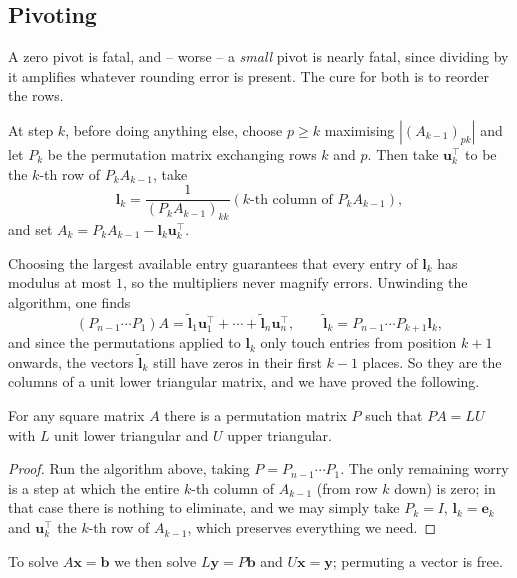 \documentclass[a4paper]{scrartcl}
\providecommand{\abs}[1]{\left\lvert#1\right\rvert}
\renewcommand{\abs}[1]{\left\lvert#1\right\rvert}
\begin{document}
\subsection{Pivoting}

A zero pivot is fatal, and -- worse -- a \emph{small} pivot is nearly fatal, since dividing by it amplifies whatever rounding error is present. The cure for both is to reorder the rows.

\begin{method}
  At step $k$, before doing anything else, choose $p \geq k$ maximising $\abs{(A_{k-1})_{pk}}$ and let $P_k$ be the permutation matrix exchanging rows $k$ and $p$. Then take $\mathbf{u}_k^\top$ to be the $k$-th row of $P_kA_{k-1}$, take
  $$
  \mathbf{l}_k = \frac{1}{(P_kA_{k-1})_{kk}}\left(k\text{-th column of }P_kA_{k-1}\right),
  $$
  and set $A_k = P_kA_{k-1} - \mathbf{l}_k\mathbf{u}_k^\top$.
\end{method}

Choosing the largest available entry guarantees that every entry of $\mathbf{l}_k$ has modulus at most $1$, so the multipliers never magnify errors. Unwinding the algorithm, one finds
$$
(P_{n-1}\cdots P_1)A = \tilde{\mathbf{l}}_1\mathbf{u}_1^\top + \cdots + \tilde{\mathbf{l}}_n\mathbf{u}_n^\top, \qquad \tilde{\mathbf{l}}_k = P_{n-1}\cdots P_{k+1}\mathbf{l}_k,
$$
and since the permutations applied to $\mathbf{l}_k$ only touch entries from position $k+1$ onwards, the vectors $\tilde{\mathbf{l}}_k$ still have zeros in their first $k-1$ places. So they are the columns of a unit lower triangular matrix, and we have proved the following.

\begin{theorem}
  For any square matrix $A$ there is a permutation matrix $P$ such that $PA = LU$ with $L$ unit lower triangular and $U$ upper triangular.
\end{theorem}
\begin{proof}
  Run the algorithm above, taking $P = P_{n-1}\cdots P_1$. The only remaining worry is a step at which the entire $k$-th column of $A_{k-1}$ (from row $k$ down) is zero; in that case there is nothing to eliminate, and we may simply take $P_k = I$, $\mathbf{l}_k = \mathbf{e}_k$ and $\mathbf{u}_k^\top$ the $k$-th row of $A_{k-1}$, which preserves everything we need.
\end{proof}

To solve $A\mathbf{x} = \mathbf{b}$ we then solve $L\mathbf{y} = P\mathbf{b}$ and $U\mathbf{x} = \mathbf{y}$; permuting a vector is free.
\end{document}
